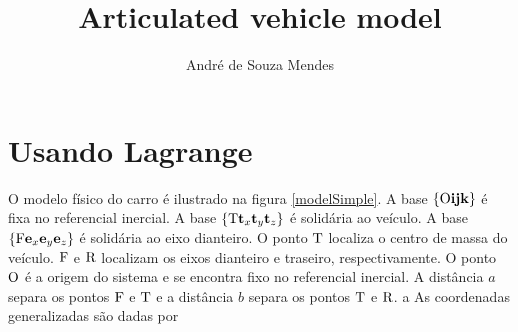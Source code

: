 \documentclass[sublist]{fei}
\author{André de Souza Mendes}
\title{Articulated vehicle model}
\begin{document}
\maketitle












\section{Usando Lagrange}

O modelo físico do carro é ilustrado na figura \ref{modelSimple}. A base \( \{ {\rm O} {\bf i} {\bf j} {\bf k} \}\) é fixa no referencial inercial. A base \( \{ {\rm T} {\bf t}_x {\bf t}_y {\bf t}_z \}\) é solidária ao veículo. A base \( \{ {\rm F} {\bf e}_x {\bf e}_y {\bf e}_z \}\) é solidária ao eixo dianteiro. O ponto \({\rm T}\) localiza o centro de massa do veículo. \({\rm F}\) e \({\rm R}\) localizam os eixos dianteiro e traseiro, respectivamente. O ponto \({\rm O}\) é a origem do sistema e se encontra fixo no referencial inercial. A distância \(a\) separa os pontos \({\rm F}\) e \({\rm T}\) e a distância \(b\) separa os pontos \({\rm T}\) e \({\rm R}\).
a
As coordenadas generalizadas são dadas por
\end{document}
